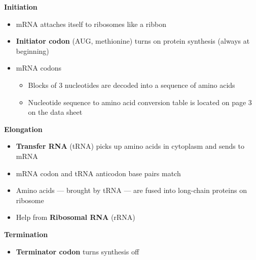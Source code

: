 \documentclass[a4paper,12pt]{article}
\begin{document}
\textbf{Initiation}
\begin{itemize}
    \item{mRNA attaches itself to ribosomes like a ribbon}
    \item{\textbf{Initiator codon} (AUG, methionine) turns on protein synthesis (always at beginning)}
    \item{
            mRNA codons
            \begin{itemize}
                \item{Blocks of 3 nucleotides are decoded into a sequence of amino acids}
                \item{Nucleotide sequence to amino acid conversion table is located on page 3 on the data sheet}
            \end{itemize}
        }
\end{itemize}

\textbf{Elongation}
\begin{itemize}
    \item{\textbf{Transfer RNA} (tRNA) picks up amino acids in cytoplasm and sends to mRNA}
    \item{mRNA codon and tRNA anticodon base pairs match}
    \item{Amino acids --- brought by tRNA --- are fused into long-chain proteins on ribosome}
    \item{Help from \textbf{Ribosomal RNA} (rRNA)}
\end{itemize}

\textbf{Termination}
\begin{itemize}
    \item{\textbf{Terminator codon} turns synthesis off}
\end{itemize}
\end{document}
